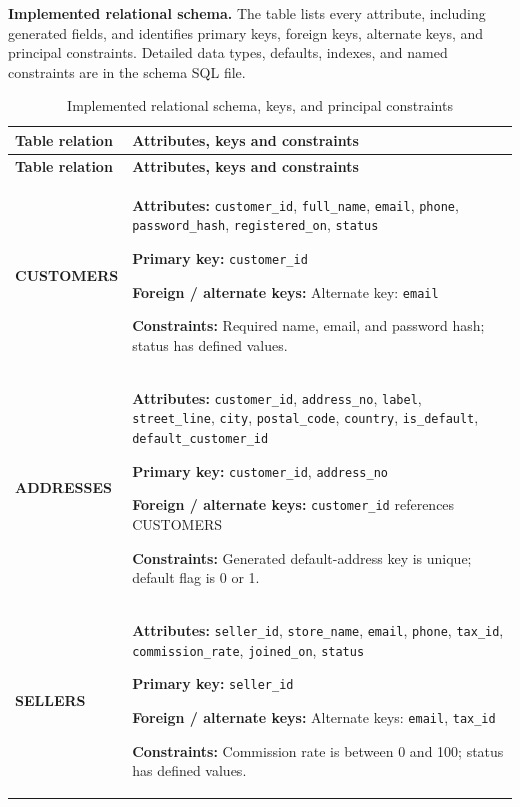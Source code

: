 \documentclass[11pt,a4paper,oneside]{report}
\begin{document}
\clearpage
{}
{}
\small
\textbf{Implemented relational schema.} The table lists every attribute, including generated fields, and identifies primary keys, foreign keys, alternate keys, and principal constraints. Detailed data types, defaults, indexes, and named constraints are in the schema SQL file.
\setlength{\tabcolsep}{2pt}
\begin{longtable}{@{}P{39mm}P{117mm}@{}}
\caption{Implemented relational schema, keys, and principal constraints}\label{tab:schema}\\
\toprule
\textbf{Table relation} & \textbf{Attributes, keys and constraints}\\\midrule
\endfirsthead
\toprule
\textbf{Table relation} & \textbf{Attributes, keys and constraints}\\\midrule
\endhead
\bottomrule
\endfoot
\textbf{CUSTOMERS} & \textbf{Attributes:} \texttt{customer\_id}, \texttt{full\_name}, \texttt{email}, \texttt{phone}, \texttt{password\_hash}, \texttt{registered\_on}, \texttt{status}\par\textbf{Primary key:} \texttt{customer\_id}\par\textbf{Foreign / alternate keys:} Alternate key: \texttt{email}\par\textbf{Constraints:} Required name, email, and password hash; status has defined values. \\
\textbf{ADDRESSES} & \textbf{Attributes:} \texttt{customer\_id}, \texttt{address\_no}, \texttt{label}, \texttt{street\_line}, \texttt{city}, \texttt{postal\_code}, \texttt{country}, \texttt{is\_default}, \texttt{default\_customer\_id}\par\textbf{Primary key:} \texttt{customer\_id}, \texttt{address\_no}\par\textbf{Foreign / alternate keys:} \texttt{customer\_id} references CUSTOMERS\par\textbf{Constraints:} Generated default-address key is unique; default flag is 0 or 1. \\
\textbf{SELLERS} & \textbf{Attributes:} \texttt{seller\_id}, \texttt{store\_name}, \texttt{email}, \texttt{phone}, \texttt{tax\_id}, \texttt{commission\_rate}, \texttt{joined\_on}, \texttt{status}\par\textbf{Primary key:} \texttt{seller\_id}\par\textbf{Foreign / alternate keys:} Alternate keys: \texttt{email}, \texttt{tax\_id}\par\textbf{Constraints:} Commission rate is between 0 and 100; status has defined values. \\

\end{longtable}
\end{document}
